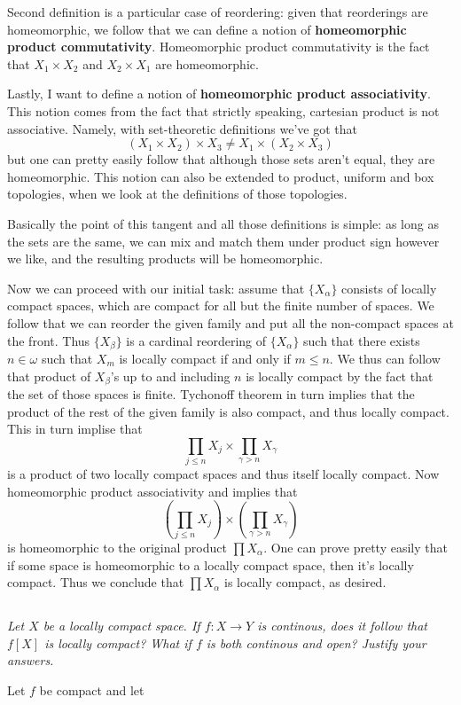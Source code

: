 \documentclass[11pt,oneside,titlepage]{book}
\newcommand{\set}[1]{\{ #1 \}}
\begin{document}
Second definition is a particular case of reordering: given that reorderings are
homeomorphic, we follow that we can define a notion of \textbf{homeomorphic product commutativity}.
Homeomorphic product commutativity is the fact that $X_1 \times X_2$ and $X_2 \times X_1$
are homeomorphic.

Lastly, I want to define a notion of \textbf{homeomorphic product associativity}. This
notion comes from the fact that strictly speaking, cartesian product is not associative.
Namely, with set-theoretic definitions we've got that 
$$(X_1 \times X_2) \times X_3 \neq X_1 \times (X_2 \times X_3)$$
but one can pretty easily follow that although those sets aren't equal, they are homeomorphic.
This notion can also be extended to product, uniform and box topologies, when we look
at the definitions of those topologies.

Basically the point of this tangent and all those definitions is simple: as long as the sets
are the same, we can mix and match them under product sign however we like, and the resulting
products will be homeomorphic.

Now we can proceed with our initial task: assume that $\set{X_\alpha}$ consists
of locally compact spaces, which are compact for all but the finite number of spaces.
We follow that we can reorder the given family and put all the non-compact spaces at the front.
Thus $\set{X_\beta}$ is a cardinal reordering of $\set{X_\alpha}$ such that there exists
$n \in \omega$ such that $X_m$ is locally compact if and only if $m \leq n$. We thus
can follow that product of $X_\beta$'s up to and including $n$ is locally compact by
the fact that the set of those spaces is finite. Tychonoff theorem in turn implies that
the product of the rest of the given family is also compact, and thus locally compact. This
in turn implise that
$$\prod_{j \leq n}{X_j} \times \prod_{\gamma > n}{X_\gamma}$$
is a product of two locally compact spaces and thus itself locally compact. 
Now homeomorphic product associativity and  implies that
$$\left(\prod_{j \leq n}{X_j}\right) \times \left(\prod_{\gamma > n}{X_\gamma}\right)$$
is homeomorphic to the original product $\prod{X_\alpha}$. One can prove pretty easily that
if some space is homeomorphic to a locally compact space, then it's locally compact. Thus
we conclude that $\prod{X_\alpha}$ is locally compact, as desired.

\subsection{}

\textit{Let $X$ be a locally compact space. If $f: X \to Y$ is continous, does it follow that
  $f[X]$ is locally compact? What if $f$ is both continous and open? Justify your answers.}

Let $f$ be compact and let
\end{document}
